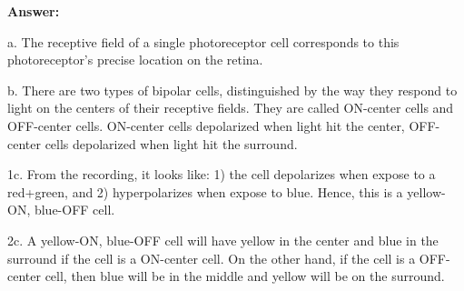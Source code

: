 \documentclass[letterpaper, 11pt]{article}
\begin{document}
\textbf{Answer:}

a. The receptive field of a single photoreceptor cell corresponds to this photoreceptor's precise location on the retina.

b. There are two types of bipolar cells, distinguished by the way they respond to light on the centers of their receptive fields. They are called ON-center cells and OFF-center cells. ON-center cells depolarized when light hit the center, OFF-center cells depolarized when light hit the surround.

1c. From the recording, it looks like: 1) the cell depolarizes when expose to a red+green, and 2) hyperpolarizes when expose to blue. Hence, this is a yellow-ON, blue-OFF cell. 

2c. A yellow-ON, blue-OFF cell will have yellow in the center and blue in the surround if the cell is a ON-center cell. On the other hand, if the cell is a OFF-center cell, then blue will be in the middle and yellow will be on the surround.





\end{document}
